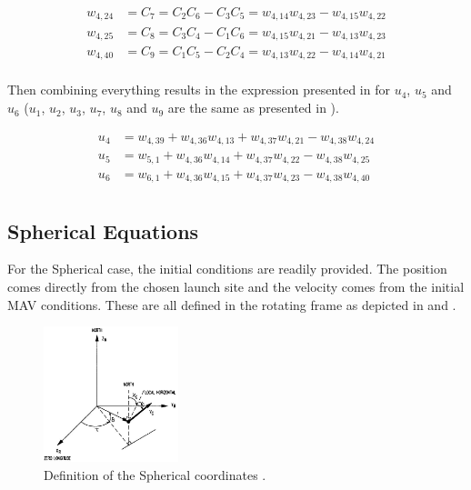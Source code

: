 \begin{equation} \label{eq:kHatAuxF}
\begin{split}
w_{4,24} &= C_{7} = C_{2}C_{6}-C_{3}C_{5} = w_{4,14}w_{4,23}-w_{4,15}w_{4,22} \\
w_{4,25} &= C_{8} = C_{3}C_{4}-C_{1}C_{6} = w_{4,15}w_{4,21}-w_{4,13}w_{4,23}\\
w_{4,40} &= C_{9} = C_{1}C_{5}-C_{2}C_{4} = w_{4,13}w_{4,22}-w_{4,14}w_{4,21}\\
\end{split}
\end{equation}

\noindent
Then combining everything results in the expression presented in  for $u_{4}$, $u_{5}$ and $u_{6}$ ($u_{1}$, $u_{2}$, $u_{3}$, $u_{7}$, $u_{8}$ and $u_{9}$ are the same as presented in ). 

\begin{equation} \label{eq:finalAccAuxF}
\begin{split}
u_{4} &= w_{4,39}+w_{4,36}w_{4,13}+w_{4,37}w_{4,21}-w_{4,38}w_{4,24} \\
u_{5} &= w_{5,1}+w_{4,36}w_{4,14}+w_{4,37}w_{4,22}-w_{4,38}w_{4,25} \\
u_{6} &= w_{6,1}+w_{4,36}w_{4,15}+w_{4,37}w_{4,23}-w_{4,38}w_{4,40} \\
\end{split}
\end{equation}
















\subsection{Spherical Equations}
\label{subsec:sphereq}
For the Spherical case, the initial conditions are readily provided. The position comes directly from the chosen launch site and the velocity comes from the initial \ac{MAV} conditions. These are all defined in the rotating frame as depicted in  and .

 \begin{figure}[H]
\centering
\includegraphics[width=0.35\textwidth]{figures/tsi/spherical_mooij1994motion.jpg}
\caption{Definition of the Spherical coordinates \citep{mooij1994motion}.}
\label{fig:spherical_mooij1994motion}
\end{figure}

